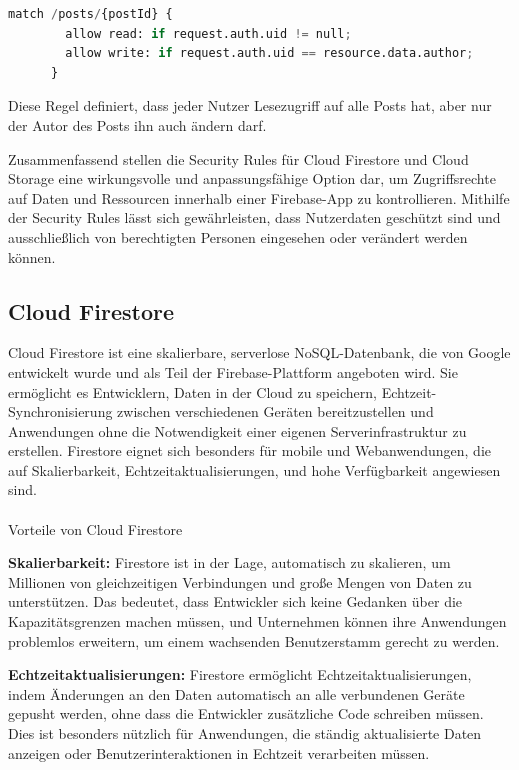 \begin{lstlisting}[language=Python,caption=Security Rules Beispiel]
    match /posts/{postId} {
        allow read: if request.auth.uid != null;
        allow write: if request.auth.uid == resource.data.author;
      }
\end{lstlisting}

Diese Regel definiert, dass jeder Nutzer Lesezugriff auf
alle Posts hat, aber nur der Autor des Posts ihn auch ändern
darf.

Zusammenfassend stellen die Security Rules für Cloud Firestore und Cloud Storage eine wirkungsvolle und anpassungsfähige Option dar, um Zugriffsrechte auf Daten und Ressourcen innerhalb einer Firebase-App zu kontrollieren. Mithilfe der Security Rules lässt sich gewährleisten, dass Nutzerdaten geschützt sind und ausschließlich von berechtigten Personen eingesehen oder verändert werden können.



\subsection{Cloud Firestore}
\author{Sandin Habibovic}

Cloud Firestore ist eine skalierbare, serverlose NoSQL-Datenbank, die von Google entwickelt wurde und als Teil der Firebase-Plattform angeboten wird. Sie ermöglicht es Entwicklern, Daten in der Cloud zu speichern, Echtzeit-Synchronisierung zwischen verschiedenen Geräten bereitzustellen und Anwendungen ohne die Notwendigkeit einer eigenen Serverinfrastruktur zu erstellen. Firestore eignet sich besonders für mobile und Webanwendungen, die auf Skalierbarkeit, Echtzeitaktualisierungen, und hohe Verfügbarkeit angewiesen sind.
\\\\
Vorteile von Cloud Firestore

\textbf{Skalierbarkeit:} Firestore ist in der Lage, automatisch zu skalieren, um Millionen von gleichzeitigen Verbindungen und große Mengen von Daten zu unterstützen. Das bedeutet, dass Entwickler sich keine Gedanken über die Kapazitätsgrenzen machen müssen, und Unternehmen können ihre Anwendungen problemlos erweitern, um einem wachsenden Benutzerstamm gerecht zu werden.

\textbf{Echtzeitaktualisierungen:} Firestore ermöglicht Echtzeitaktualisierungen, indem Änderungen an den Daten automatisch an alle verbundenen Geräte gepusht werden, ohne dass die Entwickler zusätzliche Code schreiben müssen. Dies ist besonders nützlich für Anwendungen, die ständig aktualisierte Daten anzeigen oder Benutzerinteraktionen in Echtzeit verarbeiten müssen.

